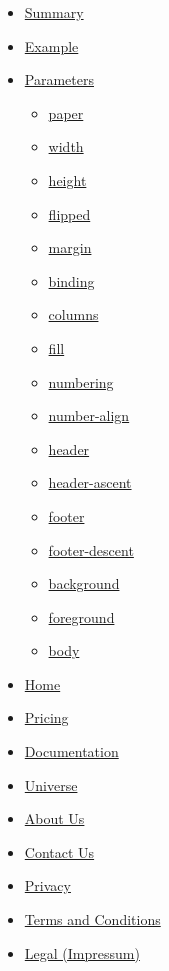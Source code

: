 \begin{itemize}
\tightlist
\item
  \hyperref[summary]{Summary}
\item
  \hyperref[example]{Example}
\item
  \hyperref[parameters]{Parameters}

  \begin{itemize}
  \tightlist
  \item
    \hyperref[parameters-paper]{paper}
  \item
    \hyperref[parameters-width]{width}
  \item
    \hyperref[parameters-height]{height}
  \item
    \hyperref[parameters-flipped]{flipped}
  \item
    \hyperref[parameters-margin]{margin}
  \item
    \hyperref[parameters-binding]{binding}
  \item
    \hyperref[parameters-columns]{columns}
  \item
    \hyperref[parameters-fill]{fill}
  \item
    \hyperref[parameters-numbering]{numbering}
  \item
    \hyperref[parameters-number-align]{number-align}
  \item
    \hyperref[parameters-header]{header}
  \item
    \hyperref[parameters-header-ascent]{header-ascent}
  \item
    \hyperref[parameters-footer]{footer}
  \item
    \hyperref[parameters-footer-descent]{footer-descent}
  \item
    \hyperref[parameters-background]{background}
  \item
    \hyperref[parameters-foreground]{foreground}
  \item
    \hyperref[parameters-body]{body}
  \end{itemize}
\end{itemize}

\begin{itemize}
\tightlist
\item
  \href{/}{Home}
\item
  \href{/pricing/}{Pricing}
\item
  \href{/docs/}{Documentation}
\item
  \href{/universe/}{Universe}
\item
  \href{/about/}{About Us}
\item
  \href{/contact/}{Contact Us}
\item
  \href{/privacy/}{Privacy}
\item
  \href{https://typst.app/terms}{Terms and Conditions}
\item
  \href{/legal/}{Legal (Impressum)}
\end{itemize}

